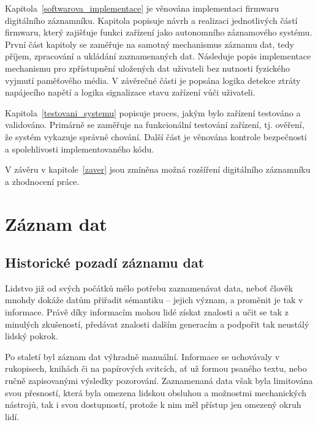 Kapitola~\ref{softwarova_implementace} je věnována implementaci firmwaru digitálního záznamníku. Kapitola popisuje návrh a realizaci jednotlivých částí firmwaru, který zajišťuje funkci zařízení jako autonomního záznamového systému. První část kapitoly se zaměřuje na samotný mechanismus záznamu dat, tedy příjem, zpracování a ukládání zaznamenaných dat. Následuje popis implementace mechanismu pro zpřístupnění uložených dat uživateli bez nutnosti fyzického vyjmutí paměťového média. V závěrečné části je popsána logika detekce ztráty napájecího napětí a logika signalizace stavu zařízení vůči uživateli.

Kapitola~\ref{testovani_systemu} popisuje proces, jakým bylo zařízení testováno a validováno. Primárně se zaměřuje na funkcionální testování zařízení, tj. ověření, že systém vykazuje správné chování. Další část je věnována kontrole bezpečnosti a spolehlivosti implementovaného kódu.

V závěru v kapitole~\ref{zaver} jsou zmíněna možná rozšíření digitálního záznamníku a zhodnocení práce.

\chapter{Záznam dat}
\label{zaznam_dat}

\section{Historické pozadí záznamu dat}
\label{pocatky}
Lidstvo již od svých počátků mělo potřebu zaznamenávat data, neboť člověk mnohdy dokáže datům přiřadit sémantiku -- jejich význam, a proměnit je tak v informace. Právě díky informacím mohou lidé získat znalosti a učit se tak z minulých zkušeností, předávat znalosti dalším generacím a podpořit tak neustálý lidský pokrok.

Po staletí byl záznam dat výhradně manuální. Informace se uchovávaly v rukopisech, knihách či na papírových svitcích, ať už formou psaného textu, nebo ručně zapisovanými výsledky pozorování. Zaznamenaná data však byla limitována svou přesností, která byla omezena lidskou obsluhou a možnostmi mechanických nástrojů, tak i svou dostupností, protože k nim měl přístup jen omezený okruh lidí. \cite{rcp_analog_vs_digital}



